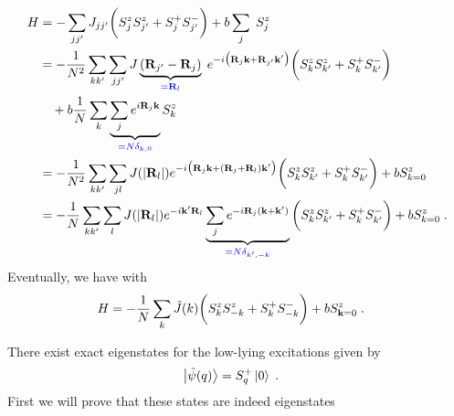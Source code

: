 \begin{align*}
H &= -\sum_{jj'} J_{jj'} \bigg(S_{j}^{z}S_{j'}^{z}+S_{j}^{+}S_{j'}^{-}\bigg)
+ b \sum_{j} \;S_{j}^{z}\\
&= -\frac{1}{N^{2}}\sum_{kk'} \sum_{jj'} J\underbrace{
(\mathbf R_{j'}-\mathbf R_{j})
}_{\color{blue} = \mathbf R_{l}}\; e^{-i \big(\mathbf R_{j} \mathbf k+\mathbf R_{j'} \mathbf k'\big)}\bigg(S_{k}^{z}S_{k'}^{z}+S_{k}^{+}S_{k'}^{-}\bigg)\\
&\quad+b\frac{1}{N}\sum_{k}
\underbrace{ 
\sum_{j} e^{i \mathbf R_{j} \mathbf k} 
}_{\color{blue} = N\delta_{k,0}} S_{k}^{z}\\
&= -\frac{1}{N^{2}}\sum_{kk'} \sum_{jl} J(|\mathbf R_{l}|) e^{-i \big(\mathbf R_{j} \mathbf k+(\mathbf R_{j}+\mathbf R_{l}) \mathbf k'\big)}\bigg(S_{k}^{z}S_{k'}^{z}+S_{k}^{+}S_{k'}^{-}\bigg)
+b  S_{k=0}^{z}\\
&= -\frac{1}{N}\sum_{kk'} \sum_{l} J(|\mathbf R_{l}|) 
e^{-i \mathbf k' \mathbf R_{l}}\underbrace{
\sum_{j}
e^{-i \mathbf R_{j} (\mathbf k+ \mathbf k')}
}_{\color{blue} = N\delta_{k',-k}}\bigg(S_{k}^{z}S_{k'}^{z}+S_{k}^{+}S_{k'}^{-}\bigg)
+b  S_{k=0}^{z}\;.
\end{align*}
%
Eventually, we have with 
%
\begin{align}\label{eq:Heisenberg:Fourier}
H
&= -\frac{1}{N} \sum_{k} \tilde J(k)
\bigg(S_{k}^{z}S_{-k}^{z}+S_{k}^{+}S_{-k}^{-}\bigg)
+b  S_{\mathbf k=0}^{z}\;.
\end{align}


There exist exact eigenstates for the low-lying excitations  given by
%
\begin{align}\label{eq:}
\ket{\tilde \psi(q)} &= S_{q}^{+} \ket{0}\;.
\end{align}
%
First  we will prove that these states are indeed eigenstates

